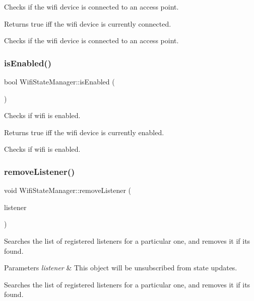 Checks if the wifi device is connected to an access point.

\begin{DoxyReturn}{Returns}
true iff the wifi device is currently connected.
\end{DoxyReturn}
Checks if the wifi device is connected to an access point. \mbox{\label{classWifiStateManager_afff012e5d9055c9fe03ff448bdc215aa}} 
\subsubsection{\texorpdfstring{is\+Enabled()}{isEnabled()}}
{\footnotesize\ttfamily bool Wifi\+State\+Manager\+::is\+Enabled (\begin{DoxyParamCaption}{ }\end{DoxyParamCaption})}

Checks if wifi is enabled.

\begin{DoxyReturn}{Returns}
true iff the wifi device is currently enabled.
\end{DoxyReturn}
Checks if wifi is enabled. \mbox{\label{classWifiStateManager_aad72d9ce616be466679c52188662d8bb}} 
\subsubsection{\texorpdfstring{remove\+Listener()}{removeListener()}}
{\footnotesize\ttfamily void Wifi\+State\+Manager\+::remove\+Listener (\begin{DoxyParamCaption}\item[{\mbox{\hyperlink{classWifiStateManager_1_1Listener}{Wifi\+State\+Manager\+::\+Listener}} $\ast$}]{listener }\end{DoxyParamCaption})}

Searches the list of registered listeners for a particular one, and removes it if it\textquotesingle{}s found.


\begin{DoxyParams}{Parameters}
{\em listener} & This object will be unsubscribed from state updates.\\
\hline
\end{DoxyParams}
Searches the list of registered listeners for a particular one, and removes it if it\textquotesingle{}s found. \mbox{\label{classWifiStateManager_a00336ecc19375303c0b82a2388d50694}} 
